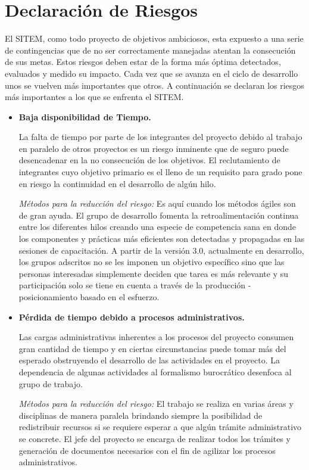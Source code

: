 \chapter{Declaración de Riesgos}
\label{anexo_riesgos}
El SITEM, como todo proyecto de objetivos ambiciosos, esta expuesto a una serie de contingencias que de no ser correctamente manejadas atentan la consecución de sus metas. Estos riesgos deben estar de la forma más óptima detectados, evaluados y medido su impacto. Cada vez que se avanza en el ciclo de desarrollo unos se vuelven más importantes que otros. A continuación se declaran los riesgos más importantes a los que se enfrenta el SITEM.

\begin{itemize}
\item \textbf{Baja disponibilidad de Tiempo.} 

La falta de tiempo por parte de los integrantes del proyecto debido al trabajo en paralelo de otros proyectos es un riesgo inminente que de seguro puede desencadenar en la no consecución de los objetivos. El reclutamiento de integrantes cuyo objetivo primario es el lleno de un requisito para grado pone en riesgo la continuidad en el desarrollo de algún hilo.

\textit{Métodos para la reducción del riesgo:} Es aquí cuando los métodos ágiles son de gran ayuda. El grupo de desarrollo fomenta la retroalimentación continua entre los diferentes hilos creando una especie de competencia sana en donde los componentes y prácticas más eficientes son detectadas y propagadas en las sesiones de capacitación. A partir de la versión 3.0, actualmente en desarrollo, los grupos adscritos no se les imponen un objetivo específico sino que las personas interesadas simplemente deciden que tarea es más relevante y su participación solo se tiene en cuenta a través de la producción - posicionamiento basado en el esfuerzo. 


\item \textbf{Pérdida de tiempo debido a procesos administrativos.} 

Las cargas administrativas inherentes a los procesos del proyecto consumen gran cantidad de tiempo y en ciertas circunstancias puede tomar más del esperado obstruyendo el desarrollo de las actividades en el proyecto. La dependencia de algunas actividades al formalismo burocrático desenfoca al grupo de trabajo.

\textit{Métodos para la reducción del riesgo:}  El trabajo se realiza en varias áreas y disciplinas de manera paralela brindando siempre la posibilidad de redistribuir recursos si se requiere esperar a que algún trámite administrativo se concrete.  El jefe del proyecto se encarga de realizar todos los trámites y generación de documentos necesarios con el fin de agilizar los procesos administrativos. 



\end{itemize}
